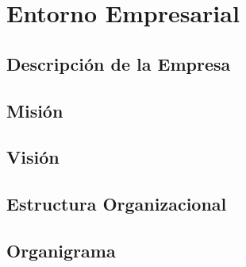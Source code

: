 \chapter{Entorno Empresarial}
\label{capituloEmpresa}
\section{Descripción de la Empresa}
\section{Misión}
\section{Visión}
\section{Estructura Organizacional}
\section{Organigrama}


